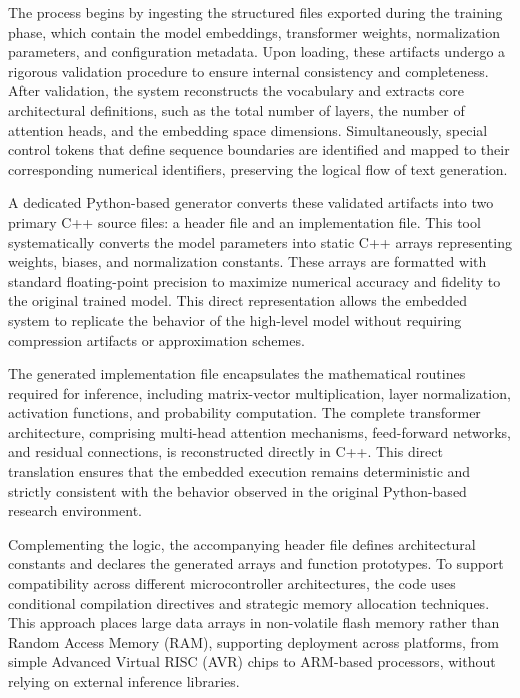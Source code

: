 \documentclass{ieeeaccess}
\begin{document}
The process begins by ingesting the structured files exported during the training phase, which contain the model embeddings, transformer weights, normalization parameters, and configuration metadata. Upon loading, these artifacts undergo a rigorous validation procedure to ensure internal consistency and completeness. After validation, the system reconstructs the vocabulary and extracts core architectural definitions, such as the total number of layers, the number of attention heads, and the embedding space dimensions. Simultaneously, special control tokens that define sequence boundaries are identified and mapped to their corresponding numerical identifiers, preserving the logical flow of text generation.

A dedicated Python-based generator converts these validated artifacts into two primary C++ source files: a header file and an implementation file. This tool systematically converts the model parameters into static C++ arrays representing weights, biases, and normalization constants. These arrays are formatted with standard floating-point precision to maximize numerical accuracy and fidelity to the original trained model. This direct representation allows the embedded system to replicate the behavior of the high-level model without requiring compression artifacts or approximation schemes.

The generated implementation file encapsulates the mathematical routines required for inference, including matrix-vector multiplication, layer normalization, activation functions, and probability computation. The complete transformer architecture, comprising multi-head attention mechanisms, feed-forward networks, and residual connections, is reconstructed directly in C++. This direct translation ensures that the embedded execution remains deterministic and strictly consistent with the behavior observed in the original Python-based research environment.

Complementing the logic, the accompanying header file defines architectural constants and declares the generated arrays and function prototypes. To support compatibility across different microcontroller architectures, the code uses conditional compilation directives and strategic memory allocation techniques. This approach places large data arrays in non-volatile flash memory rather than Random Access Memory (RAM), supporting deployment across platforms, from simple Advanced Virtual RISC (AVR) chips to ARM-based processors, without relying on external inference libraries.
\end{document}
